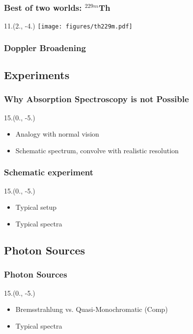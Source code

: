 \documentclass{beamer}
\begin{document}
\begin{frame}
    \frametitle{Best of two worlds: $^{229m}$Th}
    \begin{textblock}{11.}(2., -4.)
        \texttt{[image: figures/th229m.pdf]}
    \end{textblock}
\end{frame}

\begin{frame}
    \frametitle{Doppler Broadening}
    
\end{frame}

\subsection{Experiments}

\begin{frame}
    \frametitle{Why Absorption Spectroscopy is not Possible}
    \begin{textblock}{15.}(0., -5.)
        \begin{itemize}
            \item Analogy with normal vision
            \item Schematic spectrum, convolve with realistic resolution
        \end{itemize}
    \end{textblock}
\end{frame}

\begin{frame}
    \frametitle{Schematic experiment}
    \begin{textblock}{15.}(0., -5.)
        \begin{itemize}
            \item Typical setup
            \item Typical spectra
        \end{itemize}
    \end{textblock}
\end{frame}

\subsection{Photon Sources}

\begin{frame}
    \frametitle{Photon Sources}
    \begin{textblock}{15.}(0., -5.)
        \begin{itemize}
            \item Bremsstrahlung vs. Quasi-Monochromatic (Comp)
            \item Typical spectra
        \end{itemize}
    \end{textblock}
\end{frame}
\end{document}
